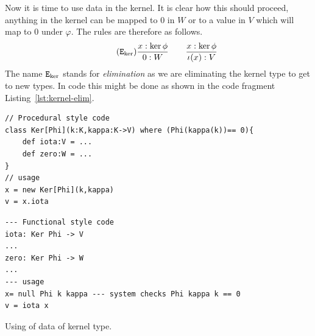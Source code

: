 \documentclass[12pt,twoside,dvipsnames,letterpaper]{memoir}
\begin{document}
Now it is time to use data in the kernel.  It is clear how this should 
proceed, anything in the kernel can be mapped to $0$ in $W$ or to a 
value in $V$ which will map to $0$ under $\varphi$.  The rules are therefore 
as follows.    
\begin{gather}
    \tag{$\elim{\ker}$}
    \frac{
        x:\ker\phi
    }{
        0:W
    }\qquad
    \frac{
        x:\ker\phi
    }{
        \iota(x):V
    }
\end{gather}
The name $\mathtt{E}_{\ker}$ stands for \emph{elimination} as we are eliminating 
the kernel type to get to new types.
In code this might be done as shown in the code fragment Listing~\ref{lst:kernel-elim}.
\begin{lstfloat}[!htbp]
\begin{lstlisting}[language=Sava]
// Procedural style code
class Ker[Phi](k:K,kappa:K->V) where (Phi(kappa(k))== 0){
    def iota:V = ...
    def zero:W = ...
}
// usage 
x = new Ker[Phi](k,kappa)
v = x.iota
\end{lstlisting}
\begin{lstlisting}[language=Hidris]
--- Functional style code
iota: Ker Phi -> V
...
zero: Ker Phi -> W
...
--- usage 
x= null Phi k kappa --- system checks Phi kappa k == 0
v = iota x
\end{lstlisting}    
\caption{Using of data of kernel type.}
\label{lst:kernel-elim}
\end{lstfloat}
\end{document}
